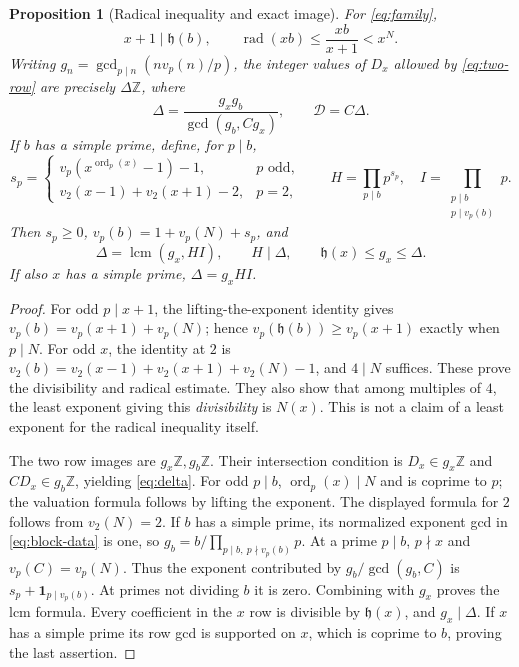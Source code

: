 \documentclass[11pt,a4paper]{article}
\newtheorem{proposition}[theorem]{Proposition}
\theoremstyle{definition}\newtheorem{question}[theorem]{Question}
\theoremstyle{remark}\newtheorem{remark}[theorem]{Remark}
\newcommand{\Z}{\mathbb Z}\newcommand{\R}{\mathbb R}
\newcommand{\Dgen}{\mathcal D}\newcommand{\mpr}{m_{\mathrm{prim}}}
\newcommand{\hh}{\mathfrak h}\newcommand{\ee}{\mathrm e}
\DeclareMathOperator{\rad}{rad}\DeclareMathOperator{\supp}{supp}
\DeclareMathOperator{\lcm}{lcm}\DeclareMathOperator{\ord}{ord}
\begin{document}
\begin{proposition}[Radical inequality and exact image]\label{prop:radical-image}
For \eqref{eq:family},
\begin{equation}\label{eq:radical}
 x+1\mid\hh(b),\qquad
 \rad(xb)\le\frac{xb}{x+1}<x^N.
\end{equation}
Writing $g_n=\gcd_{p\mid n}(n v_p(n)/p)$, the integer values of $D_x$
allowed by \eqref{eq:two-row} are precisely $\Delta\Z$, where
\begin{equation}\label{eq:delta}
 \Delta=\frac{g_xg_b}{\gcd(g_b,Cg_x)},\qquad \Dgen=C\Delta.
\end{equation}
If $b$ has a simple prime, define, for $p\mid b$,
\[
 s_p=\begin{cases}
 v_p(x^{\ord_p(x)}-1)-1,&p\text{ odd},\\
 v_2(x-1)+v_2(x+1)-2,&p=2,
 \end{cases}\qquad
 H=\prod_{p\mid b}p^{s_p},\quad I=\prod_{\substack{p\mid b\\p\mid v_p(b)}}p.
\]
Then $s_p\ge0$, $v_p(b)=1+v_p(N)+s_p$, and
\begin{equation}\label{eq:delta-local}
 \Delta=\lcm(g_x,HI),\qquad H\mid\Delta,\qquad\hh(x)\le g_x\le\Delta.
\end{equation}
If also $x$ has a simple prime, $\Delta=g_xHI$.
\end{proposition}
\begin{proof}
For odd $p\mid x+1$, the lifting-the-exponent identity gives
$v_p(b)=v_p(x+1)+v_p(N)$; hence $v_p(\hh(b))\ge v_p(x+1)$
exactly when $p\mid N$. For odd $x$, the identity at $2$ is
$v_2(b)=v_2(x-1)+v_2(x+1)+v_2(N)-1$, and $4\mid N$ suffices.
These prove the divisibility and radical estimate. They also show
that among multiples of $4$, the least exponent giving this
\emph{divisibility} is $N(x)$. This is not a claim of a least exponent
for the radical inequality itself.

The two row images are $g_x\Z,g_b\Z$. Their intersection condition
is $D_x\in g_x\Z$ and $CD_x\in g_b\Z$, yielding \eqref{eq:delta}.
For odd $p\mid b$, $\ord_p(x)\mid N$ and is coprime to $p$;
the valuation formula follows by lifting the exponent. The displayed
formula for $2$ follows from $v_2(N)=2$.
If $b$ has a simple prime, its normalized exponent gcd in
\eqref{eq:block-data} is one, so
$g_b=b/\prod_{p\mid b,\ p\nmid v_p(b)}p$.
At a prime $p\mid b$, $p\nmid x$ and $v_p(C)=v_p(N)$.
Thus the exponent contributed by $g_b/\gcd(g_b,C)$ is
$s_p+\boldsymbol{1}_{p\mid v_p(b)}$.
At primes not dividing $b$ it is zero. Combining with $g_x$ proves
the lcm formula. Every coefficient in the $x$ row is divisible by
$\hh(x)$, and $g_x\mid\Delta$. If $x$ has a simple prime its row gcd
is supported on $x$, which is coprime to $b$, proving the last assertion.
\end{proof}
\end{document}
